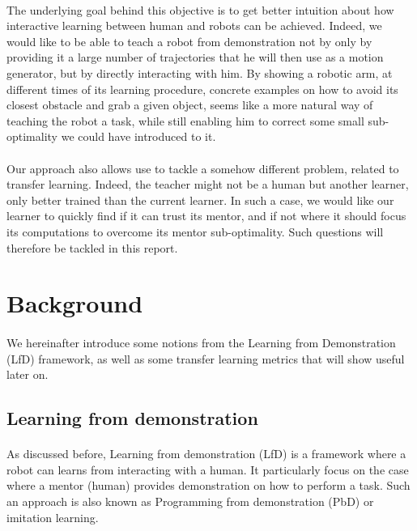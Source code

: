 \documentclass[a4paper]{report}
\begin{document}
{{			\paragraph{} The underlying goal behind this objective is to get better intuition about how interactive learning between human and robots can be achieved. Indeed, we would like to be able to teach a robot from demonstration not by only by providing it a large number of trajectories that he will then use as a motion generator, but by directly interacting with him. By showing a robotic arm, at different times of its learning procedure, concrete examples on how to avoid its closest obstacle and grab a given object, seems like a more natural way of teaching the robot a task, while still enabling him to correct some small sub-optimality we could have introduced to it. 
			
			\paragraph{} Our approach also allows use to tackle a somehow different problem, related to transfer learning. Indeed, the teacher might not be a human but another learner, only better trained than the current learner. In such a case, we would like our learner to quickly find if it can trust its mentor, and if not where it should focus its computations to overcome its mentor sub-optimality. Such questions will therefore be tackled in this report. 
		}
		\section{Background}
		{
			\paragraph{} We hereinafter introduce some notions from the Learning from Demonstration (LfD) framework, as well as some transfer learning metrics that will show useful later on. 
			\subsection{Learning from demonstration}
			{
				\paragraph{} As discussed before, Learning from demonstration (LfD) is a framework where a robot can learns from interacting with a human. It particularly focus on the case where a mentor (human) provides demonstration on how to perform a task. Such an approach is also known as Programming from demonstration (PbD) or imitation learning. 
				
}}}
\end{document}
